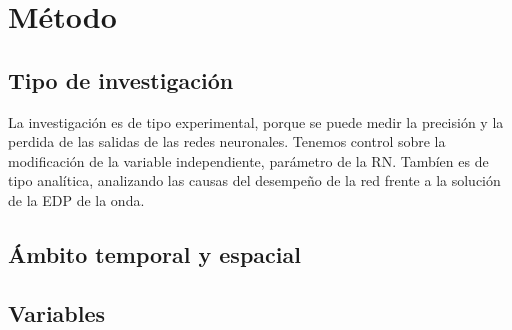 \chapter{Método}
\thispagestyle{empty}

\section{Tipo de investigación}


La investigación es de tipo experimental, porque se puede medir la precisión y la perdida de las salidas de las redes neuronales. Tenemos control sobre la modificación de la variable independiente, parámetro de la RN. Tambíen es de tipo analítica, analizando las causas  del desempeño de la red frente a la solución de la EDP de la onda.



\section{Ámbito temporal y espacial}


\section{Variables}


